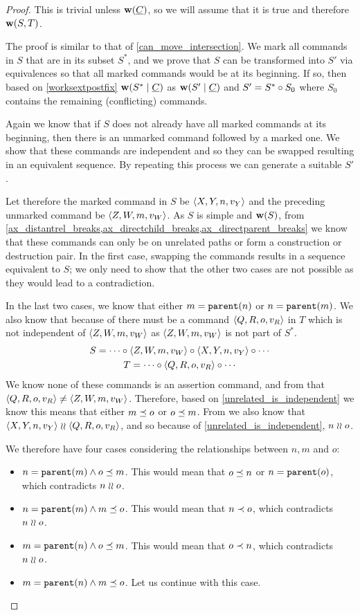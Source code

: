 \begin{proof}
This is trivial unless $\mathbf{w}({\underline{C}})$, so we will assume that it is true
and therefore $\mathbf{w}({S,T})$.

The proof is similar to that of \cref{can_move_intersection}.
We mark all commands in $S$ that are in its subset $S^*$, and
we prove that $S$ can be transformed into $S'$ via equivalences
so that all marked commands would be at its beginning.
If so, then based on \cref{worksextpostfix}
$\mathbf{w}({S^*}\mathrel{|}{\underline{C}})$ as $\mathbf{w}({S'}\mathrel{|}{\underline{C}})$ and $S'=S^*\circ S_0$ 
where $S_0$ contains the remaining (conflicting) commands.

Again we know that if $S$ does not already have all marked commands at its beginning,
then there is an unmarked command followed by a marked one.
We show that these commands are independent and so they can be swapped
resulting in an equivalent sequence.
By repeating this process we can generate a suitable $S'$.

Let therefore the marked command in $S$ be $\langle{X,Y,n,v_Y}\rangle$
and the preceding unmarked command be $\langle{Z,W,m,v_W}\rangle$.
As $S$ is simple and $\mathbf{w}({S})$, from 
\cref{ax_distantrel_breaks,ax_directchild_breaks,ax_directparent_breaks}
we know that these commands can only be on unrelated paths or form a construction or destruction pair.
In the first case, swapping the commands results in a sequence equivalent to $S$;
we only need to show that the other two cases are not possible as they would lead to a contradiction.

In the last two cases, we know that either $m=\mathtt{parent}(n)$ or $n=\mathtt{parent}(m)$.
We also know that because of {\condApr} there must be 
a command $\langle{Q,R,o,v_R}\rangle$ in $T$ which is not independent of $\langle{Z,W,m,v_W}\rangle$
as $\langle{Z,W,m,v_W}\rangle$ is not part of $S^*$.
\begin{gather*}
S = \cdots\circ  \langle{Z,W,m,v_W}\rangle\circ  \langle{X,Y,n,v_Y}\rangle\circ  \cdots \\
T = \cdots\circ  \langle{Q,R,o,v_R}\rangle\circ \cdots
\end{gather*}
We know none of these commands is an assertion command, and 
from {\condDisj} that $\langle{Q,R,o,v_R}\rangle\neq\langle{Z,W,m,v_W}\rangle$.
Therefore, based on \cref{unrelated_is_independent} we know this means that
either $m\preceq o$ or $o\preceq m$.
From {\condApr} we also know that $\langle{X,Y,n,v_Y}\rangle\mathrel{\wr\wr} \langle{Q,R,o,v_R}\rangle$,
and so because of \cref{unrelated_is_independent},
$n\mathrel{\wr\wr} o$.

We therefore have four cases considering the relationships between $n,m$ and $o$:
\begin{itemize}
\item $n=\mathtt{parent}(m) \wedge o\preceq m$.
   This would mean that $o\preceq n$ or $n=\mathtt{parent}(o)$, which contradicts $n\mathrel{\wr\wr} o$.
\item $n=\mathtt{parent}(m) \wedge m\preceq o$.
   This would mean that $n\prec o$, which contradicts $n\mathrel{\wr\wr} o$.
\item $m=\mathtt{parent}(n) \wedge o\preceq m$.
   This would mean that $o\prec n$, which contradicts $n\mathrel{\wr\wr} o$.
\item $m=\mathtt{parent}(n) \wedge m\preceq o$.
   Let us continue with this case.
\end{itemize}


\end{proof}

